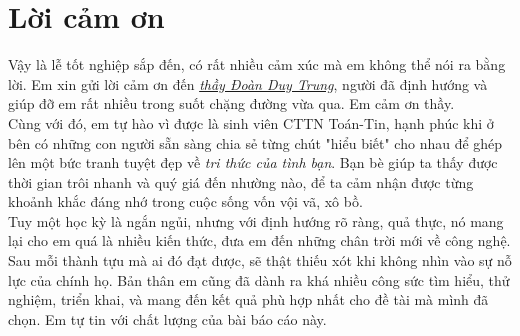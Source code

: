 \thispagestyle{empty} %
\section*{Lời cảm ơn}

Vậy là lễ tốt nghiệp sắp đến, có rất nhiều cảm xúc mà em không thể nói ra bằng lời. Em xin gửi lời cảm ơn đến \href{mailto:}{\textit{thầy Đoàn Duy Trung}}, người đã định hướng và giúp đỡ em rất nhiều trong suốt chặng đường vừa qua. Em cảm ơn thầy.\\

Cùng với đó, em tự hào vì được là sinh viên CTTN Toán-Tin, hạnh phúc khi ở bên có những con người sẵn sàng chia sẻ từng chút "hiểu biết" cho nhau để ghép lên một bức tranh tuyệt đẹp về \textit{tri thức của tình bạn}. Bạn bè giúp ta thấy được thời gian trôi nhanh và quý giá đến nhường nào, để ta cảm nhận được từng khoảnh khắc đáng nhớ trong cuộc sống vốn vội vã, xô bồ.\\

Tuy một học kỳ là ngắn ngủi, nhưng với định hướng rõ ràng, quả thực, nó mang lại cho em quá là nhiều kiến thức, đưa em đến những chân trời mới về công nghệ. Sau mỗi thành tựu mà ai đó đạt được, sẽ thật thiếu xót khi không nhìn vào sự nỗ lực của chính họ. Bản thân em cũng đã dành ra khá nhiều công sức tìm hiểu, thử nghiệm, triển khai, và mang đến kết quả phù hợp nhất cho đề tài mà mình đã chọn. Em tự tin với chất lượng của bài báo cáo này.\\